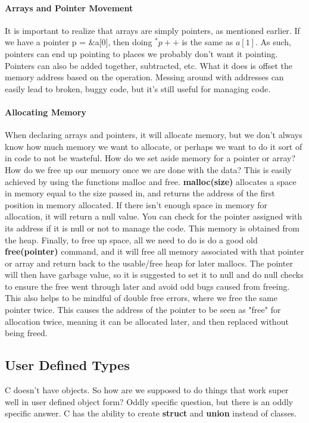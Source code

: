 \paragraph{Arrays and Pointer Movement} It is important to realize that arrays are simply pointers, as mentioned earlier. If we have a pointer p = \&a[0], then doing $^*p++$ is the same as $a[1]$. As such, pointers can end up pointing to places we probably don't want it pointing. Pointers can also be added together, subtracted, etc. What it does is offset the memory address based on the operation. Messing around with addresses can easily lead to broken, buggy code, but it's still useful for managing code.

\paragraph{Allocating Memory} When declaring arrays and pointers, it will allocate memory, but we don't always know how much memory we want to allocate, or perhaps we want to do it sort of in code to not be wasteful. How do we set aside memory for a pointer or array? How do we free up our memory once we are done with the data? This is easily achieved by using the functions malloc and free. \newline
\textbf{malloc(size)} allocates a space in memory equal to the size passed in, and returns the address of the first position in memory allocated. If there isn't enough space in memory for allocation, it will return a null value. You can check for the pointer assigned with its address if it is null or not to manage the code. This memory is obtained from the heap.\newline 
Finally, to free up space, all we need to do is do a good old \textbf{free(pointer)} command, and it will free all memory associated with that pointer or array and return back to the usable/free heap for later mallocs. The pointer will then have garbage value, so it is suggested to set it to null and do null checks to ensure the free went through later and avoid odd bugs caused from freeing. This also helps to be mindful of double free errors, where we free the same pointer twice. This causes the address of the pointer to be seen as "free" for allocation twice, meaning it can be allocated later, and then replaced without being freed.

\subsection{User Defined Types}
C doesn't have objects. So how are we supposed to do things that work super well in user defined object form? Oddly specific question, but there is an oddly specific answer. C has the ability to create \textbf{struct} and \textbf{union} instead of classes.
